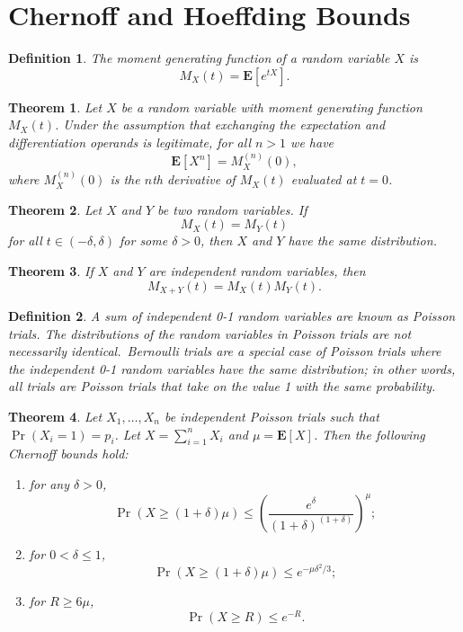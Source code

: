 \documentclass{amsart}
\newtheorem*{definition}{Definition}
\newtheorem*{theorem}{Theorem}
\newcommand{\E}{\mathbf{E}}
\begin{document}

\section{Chernoff and Hoeffding Bounds}

\begin{definition}
  The \emph{moment generating function} of a random variable $X$ is
  \[
    M_X(t) = \E[e^{tX}].
  \]
\end{definition}

\begin{theorem}
  Let $X$ be a random variable with moment generating function $M_X(t)$. Under
  the assumption that exchanging the expectation and differentiation operands is
  legitimate, for all $n > 1$ we have
  \[
    \E[X^n] = M_X^{(n)}(0),
  \]
  where $M_X^{(n)}(0)$ is the \emph{$n$th derivative} of $M_X(t)$ evaluated at
  $t = 0$.
\end{theorem}

\begin{theorem}
  Let $X$ and $Y$ be two random variables. If
  \[
    M_X(t) = M_Y(t)
  \]
  for all $t \in (-\delta, \delta)$ for some $\delta > 0$, then $X$ and $Y$ have
  the same distribution.
\end{theorem}

\begin{theorem}
  If $X$ and $Y$ are independent random variables, then
  \[
    M_{X + Y}(t) = M_X(t) M_Y(t).
  \]
\end{theorem}

\begin{definition}
  A sum of independent 0-1 random variables are known as \emph{Poisson trials}. %
  The distributions of the random variables in Poisson trials are not
  necessarily identical.\ \emph{Bernoulli trials} are a special case of Poisson
  trials where the independent 0-1 random variables have the same distribution; %
  in other words, all trials are Poisson trials that take on the value 1 with
  the same probability.
\end{definition}

\begin{theorem}
  Let $X_1, \ldots, X_n$ be independent Poisson trials such that $\Pr(X_i = 1) =
  p_i$. Let $X = \sum_{i=1}^n X_i$ and $\mu = \E[X]$. Then the following
  Chernoff bounds hold:
  \begin{enumerate}
    \item for any $\delta > 0$,
      \[
        \Pr(X \geq (1 + \delta) \mu) \leq {\left( \frac{e^\delta}{{(1 +
        \delta)}^{(1 + \delta)}} \right)}^\mu;
      \]
    \item for $0 < \delta \leq 1$,
      \[
        \Pr(X \geq (1 + \delta) \mu) \leq e^{-\mu \delta^2 / 3};
      \]
    \item for $R \geq 6 \mu$,
      \[
        \Pr(X \geq R) \leq e^{-R}.
      \]
  \end{enumerate}
\end{theorem}
\end{document}
